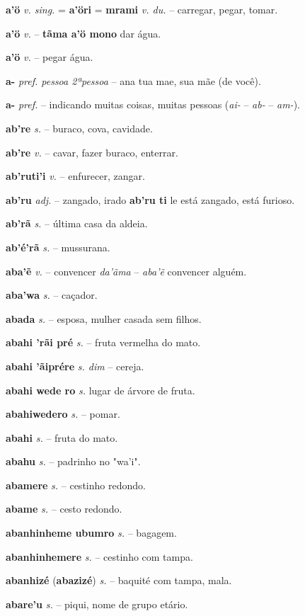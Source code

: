 \textbf{a'ö} \textit{v. sing.} = \textbf{a'öri} = \textbf{mrami} \textit{v. du.} -- carregar, pegar, tomar.

\textbf{a'ö} \textit{v.} -- \textbf{tãma a'ö mono} dar água.

\textbf{a'ö} \textit{v.} -- pegar água.

\textbf{a-} \textit{pref. pessoa 2ªpessoa} -- ana tua mae, sua mãe (de você).

\textbf{a-} \textit{pref.} -- indicando muitas coisas, muitas pessoas (\textit{ai-} -- \textit{ab-} -- \textit{am-}).

\textbf{ab're} \textit{s.} -- buraco, cova, cavidade.

\textbf{ab're} \textit{v.} -- cavar, fazer buraco, enterrar.

\textbf{ab'ruti'i} \textit{v.} -- enfurecer, zangar.

\textbf{ab'ru} \textit{adj.} -- zangado, irado \textbf{ab'ru ti} le está zangado, está furioso.

\textbf{ab'rã} \textit{s.} -- última casa da aldeia.

\textbf{ab'é'rã} \textit{s.} -- mussurana.

\textbf{aba'ẽ} \textit{v.} -- convencer  \textit{da'ãma} -- \textit{aba'ẽ} convencer alguém.

\textbf{aba'wa} \textit{s.} -- caçador.

\textbf{abada} \textit{s.} -- esposa, mulher casada sem filhos.

\textbf{abahi 'rãi pré} \textit{s.} -- fruta vermelha do mato.

\textbf{abahi 'ãiprére} \textit{s. dim} -- cereja.

\textbf{abahi wede ro} \textit{s.} lugar de árvore de fruta.

\textbf{abahiwedero} \textit{s.} -- pomar.

\textbf{abahi} \textit{s.} -- fruta do mato.

\textbf{abahu} \textit{s.} -- padrinho no "wa'i".

\textbf{abamere} \textit{s.} -- cestinho redondo.

\textbf{abame} \textit{s.} -- cesto redondo.

\textbf{abanhinheme ubumro} \textit{s.} -- bagagem.

\textbf{abanhinhemere} \textit{s.} -- cestinho com tampa.

\textbf{abanhizé} (\textbf{abazizé}) \textit{s.} --  baquité com tampa, mala.

\textbf{abare'u} \textit{s.} -- piqui,  nome de grupo etário.

